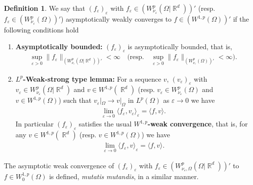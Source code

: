 \documentclass[12pt, reqno]{amsart}%
\theoremstyle{plain}  %
\theoremstyle{definition}  %
\newtheorem{definition}[theorem]{Definition}
\numberwithin{equation}{section}
\DeclareMathOperator{\R}{\mathbb{R}}
\newcommand{\eps}{\varepsilon}
\newcommand{\WnuOmRa}{W^p_{\nu_\eps}(\Omega|\R^d )}
\newcommand{\WnuOma}{W^{p}_{\nu_\eps}(\Omega)}
\begin{document}
\begin{definition}\label{def:weak-asymp-form}
We say that  $(f_\eps)_\eps$ with $f_\eps\in (W^p_{\nu_\eps}(\Omega|\R^d))'$ (resp. $f_\eps\in (W^p_{\nu_\eps}(\Omega))'$) asymptotically weakly converges to $f\in (W^{1,p}(\Omega))'$ if the following conditions hold
\begin{enumerate}[$(F_1)$]
\item \textbf{Asymptotically bounded:}   $(f_\eps)_\eps$ is asymptotically bounded,  that is,
\begin{align*}
\sup_{\eps>0} \| f_\eps\|_{(W^p_{\nu_\eps}(\Omega|\R^d))'}<\infty \quad \big(\text{resp.}\quad \sup_{\eps>0} \| f_\eps\|_{(W^p_{\nu_\eps}(\Omega))'}<\infty \big).
\end{align*}
\item \textbf{$L^p$-Weak-strong type lemma:} For  a sequence $v$, $(v_\eps)_\eps$ with $v_\eps\in\WnuOmRa$ and $v\in W^{1,p}(\R^d)$ (resp. $v_\eps\in \WnuOma$ and $v\in W^{1,p}(\Omega)$) such that $v_\eps|_\Omega\to v|_\Omega$  in $L^p(\Omega)$  as $\eps\to 0$ we have
\begin{align*}
\lim_{\eps\to0} \langle f_\eps , v_\eps \rangle_\eps
= \langle f , v\rangle .
\end{align*}
In particular $(f_\eps)_\eps$  satisfies the  usual \textbf{$W^{1,p}$-weak convergence}, that is, for   any $v\in W^{1,p}(\R^d)$ (resp. $v\in W^{1,p}(\Omega)$)  we have
\begin{align*}
\lim_{\eps\to0} \langle f_\eps , v\rangle_\eps  = \langle f , v\rangle.
\end{align*}
\end{enumerate}
The asymptotic weak convergence of $ (f_\eps)_\eps $ with $ f_\eps \in ( W^p_{\nu_\eps, \Omega}(\Omega | \R^d))' $ to$ f \in W^{1,p}_0(\Omega)$  is defined, \textit{mutatis mutandis}, in a similar manner.
\end{definition}
\end{document}
